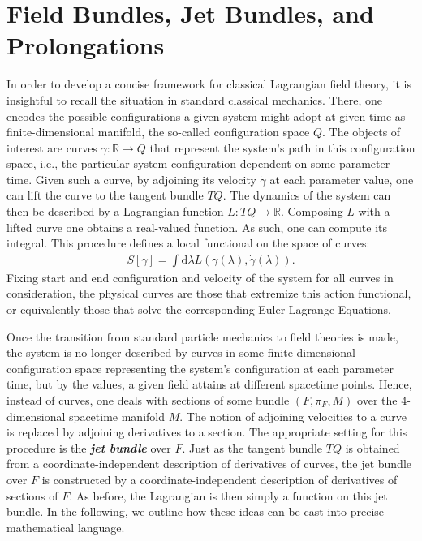 
\section{Field Bundles, Jet Bundles, and Prolongations}
In order to develop a concise framework for classical Lagrangian field theory, it is insightful to recall the situation in standard classical mechanics. There, one encodes the possible configurations a given system might adopt at given time as finite-dimensional manifold, the so-called configuration space $Q$. The objects of interest are curves $\gamma : \mathbb{R} \rightarrow Q $ that represent the system's path in this configuration space, i.e., the particular system configuration dependent on some parameter time. Given such a curve, by adjoining its velocity $\dot{\gamma}$ at each parameter value, one can lift the curve to the tangent bundle $TQ$. The dynamics of the system can then be described by a Lagrangian function $L : TQ \rightarrow \mathbb{R}$. Composing $L$ with a lifted curve one obtains a real-valued function. As such, one can compute its integral. This procedure defines a local functional on the space of curves:
\begin{align}
S[\gamma] = \int \mathrm{d}\lambda L(\gamma (\lambda), \dot{\gamma} (\lambda)).  
\end{align}
Fixing start and end configuration and velocity of the system for all curves in consideration, the physical curves are those that extremize this action functional, or equivalently those that solve the corresponding Euler-Lagrange-Equations. 

Once the transition from standard particle mechanics to field theories is made, the system is no longer described by curves in some finite-dimensional configuration space representing the system's configuration at each parameter time, but by the values, a given field attains at different spacetime points. Hence, instead of curves, one deals with sections of some bundle $(F,\pi_F,M)$ over the 4-dimensional spacetime manifold $M$. The notion of adjoining velocities to a curve is replaced by adjoining derivatives to a section. The appropriate setting for this procedure is the \textit{\textbf{jet bundle}} over $F$. Just as the tangent bundle $TQ$ is obtained from a coordinate-independent description of derivatives of curves, the jet bundle over $F$ is constructed by a coordinate-independent description of derivatives of sections of $F$. As before, the Lagrangian is then simply a function on this jet bundle. 
In the following, we outline how these ideas can be cast into precise mathematical language. 

